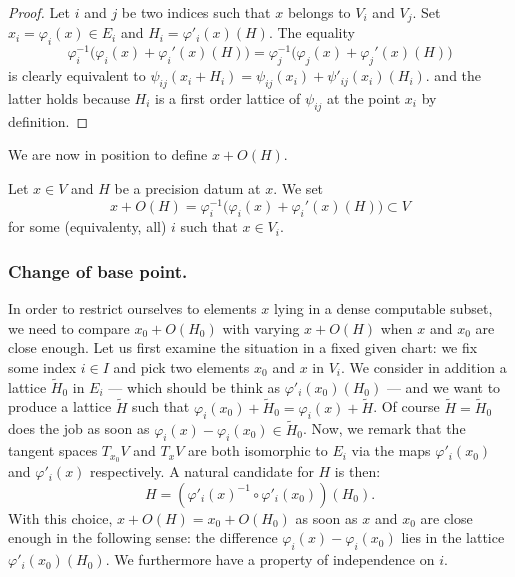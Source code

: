 \documentclass{lms}
\begin{document}
\begin{proof}
Let $i$ and $j$ be two indices such that $x$ belongs to $V_i$ and $V_j$. 
Set $x_i = \varphi_i(x) \in E_i$ and $H_i = \varphi'_i(x)(H)$. The 
equality 
\[
\varphi_i^{-1}\big(\varphi_i(x) + \varphi_i'(x)(H)\big) 
 = \varphi_j^{-1}\big(\varphi_j(x) + \varphi_j'(x)(H)\big)
 \]
is clearly equivalent to
$\psi_{ij}(x_i + H_i) = \psi_{ij}(x_i) + \psi'_{ij}(x_i)(H_i)$.
and the latter holds because $H_i$ is a first order lattice
of $\psi_{ij}$ at the point $x_i$ by definition.
\end{proof}

We are now in position to define $x + O(H)$.

\begin{deftn}
Let $x \in V$ and $H$ be a precision datum at $x$. We set
$$x + O(H) = \varphi_i^{-1}\big(\varphi_i(x) + \varphi_i'(x)(H)\big)
\subset V$$
for some (equivalenty, all) $i$ such that $x \in V_i$.
\end{deftn}

\subsubsection*{Change of base point.}

In order to restrict ourselves to elements $x$ lying in a dense 
computable subset, we need to compare $x_0 + O(H_0)$ with varying $x + 
O(H)$ when $x$ and $x_0$ are close enough. Let us first examine the 
situation in a fixed given chart: we fix some index $i \in I$ and pick 
two elements $x_0$ and $x$ in $V_i$. We consider in addition a lattice 
$\tilde H_0$ in $E_i$ --- which should be think as $\varphi'_i(x_0) 
(H_0)$ --- and we want to produce a lattice $\tilde H$ such that 
$\varphi_i(x_0) + \tilde H_0 = \varphi_i(x) + \tilde H$. Of course 
$\tilde H = \tilde H_0$ does the job as soon as 
$\varphi_i(x) - \varphi_i(x_0) \in \tilde H_0$. 
Now, we remark that the tangent spaces $T_{x_0} V$ and $T_x V$ are both 
isomorphic to $E_i$ via the maps $\varphi'_i(x_0)$ and $\varphi'_i(x)$ 
respectively. A natural candidate for $H$ is then:
\begin{equation}
\label{eq:Hprime}
H = \left(\varphi'_i(x)^{-1} \circ \varphi'_i(x_0)\right) (H_0).
\end{equation}
With this choice, $x + O(H) = x_0 + O(H_0)$ as soon as $x$ and $x_0$ are 
close enough in the following sense: the difference $\varphi_i(x) - 
\varphi_i(x_0)$ lies in the lattice $\varphi'_i(x_0)(H_0)$. We 
furthermore have a property of independence on $i$.
\end{document}
